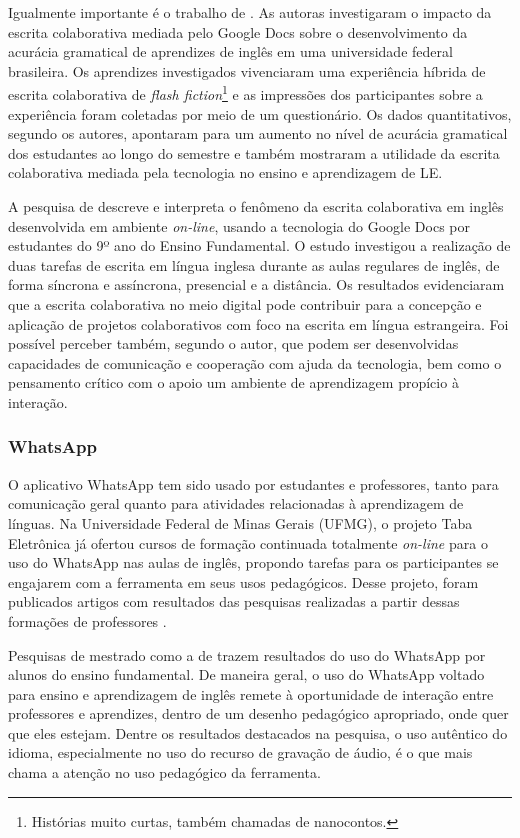 \documentclass[portuguese]{textolivre}
\begin{document}
Igualmente importante é o trabalho de \textcite{weissheimer_aplicativos_2017}. As autoras investigaram o impacto da escrita colaborativa mediada pelo Google Docs sobre o desenvolvimento da acurácia gramatical de aprendizes de inglês em uma universidade federal brasileira. Os aprendizes investigados vivenciaram uma experiência híbrida de escrita colaborativa de \textit{flash fiction}\footnote{Histórias muito curtas, também chamadas de nanocontos.} e as impressões dos participantes sobre a experiência foram coletadas por meio de um questionário. Os dados quantitativos, segundo os autores, apontaram para um aumento no nível de acurácia gramatical dos estudantes ao longo do semestre e também mostraram a utilidade da escrita colaborativa mediada pela tecnologia no ensino e aprendizagem de LE.

A pesquisa de \textcite{gartner_por_2016} descreve e interpreta o fenômeno da escrita colaborativa em inglês desenvolvida em ambiente \textit{on-line}, usando a tecnologia do Google Docs por estudantes do 9º ano do Ensino Fundamental. O estudo investigou a realização de duas tarefas de escrita em língua inglesa durante as aulas regulares de inglês, de forma síncrona e assíncrona, presencial e a distância. Os resultados evidenciaram que a escrita colaborativa no meio digital pode contribuir para a concepção e aplicação de projetos colaborativos com foco na escrita em língua estrangeira. Foi possível perceber também, segundo o autor, que podem ser desenvolvidas capacidades de comunicação e cooperação com ajuda da tecnologia, bem como o pensamento crítico com o apoio um ambiente de aprendizagem propício à interação.

\subsubsection{WhatsApp}\label{sec-autores}
O aplicativo WhatsApp tem sido usado por estudantes e professores, tanto para comunicação geral quanto para atividades relacionadas à aprendizagem de línguas. Na Universidade Federal de Minas Gerais (UFMG), o projeto Taba Eletrônica já ofertou cursos de formação continuada totalmente \textit{on-line} para o uso do WhatsApp nas aulas de inglês, propondo tarefas para os participantes se engajarem com a ferramenta em seus usos pedagógicos. Desse projeto, foram publicados artigos com resultados das pesquisas realizadas a partir dessas formações de professores \cite{braga_aprendizagem_2017,braga_reflexoes_2017}.

Pesquisas de mestrado como a de \textcite{boechat_o_2019} trazem resultados do uso do WhatsApp por alunos do ensino fundamental. De maneira geral, o uso do WhatsApp voltado para ensino e aprendizagem de inglês remete à oportunidade de interação entre professores e aprendizes, dentro de um desenho pedagógico apropriado, onde quer que eles estejam. Dentre os resultados destacados na pesquisa, o uso autêntico do idioma, especialmente no uso do recurso de gravação de áudio, é o que mais chama a atenção no uso pedagógico da ferramenta.
\end{document}
